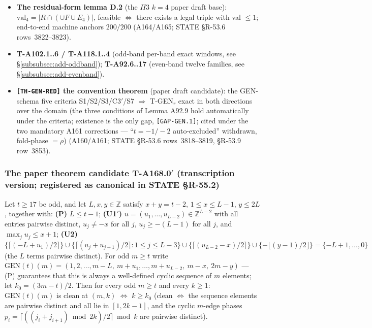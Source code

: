 \begin{itemize}
$42\to40$, $677\to659$) (A170/A171; STATE \S R-53.7 rows~3830--3831, \S
R-53.9 row~3858).
\item \textbf{The residual-form lemma D.2} (the $\Pi$3 $k=4$ paper draft
base): $\mathrm{val}_4=\lvert R\cap(\cup F\cup E_4)\rvert$,
feasible $\iff$ there exists a legal triple with val $\le1$; end-to-end
machine anchors $200/200$ (A164/A165; STATE \S R-53.6 rows~3822--3823).
\item \textbf{T-A102.1..6 / T-A118.1..4} (odd-band per-band exact windows,
see \S\ref{subsubsec:add-oddband}); \textbf{T-A92.6..17} (even-band twelve
families, see \S\ref{subsubsec:add-evenband}).
\item \textbf{\texttt{[TH-GEN-RED]} the convention theorem} (paper draft
candidate): the GEN-schema five criteria S1/S2/S3/C3$'$/S7 $\Rightarrow$
T-GEN$_r$ exact in both directions over the domain (the three conditions of
Lemma A92.9 hold automatically under the criteria; existence is the only gap,
\texttt{[GAP-GEN.1]}; cited under the two mandatory A161 corrections ---
``$t=-1/-2$ auto-excluded'' withdrawn, fold-phase $=\rho$) (A160/A161; STATE
\S R-53.6 rows~3818--3819, \S R-53.9 row~3853).
\end{itemize}

\subsubsection{The paper theorem candidate T-A168.0$'$ (transcription
version; registered as canonical in STATE \S R-55.2)
\tierPCand}\label{subsec:add-ta168paper}

\begin{theorem}\label{thm:ta168}
Let $t\ge17$ be odd, and let $L,x,y\in\mathbb{Z}$ satisfy $x+y=t-2$,
$1\le x\le L-1$, $y\le2L$, together with: \textbf{(P)} $L\le t-1$;
\textbf{(U1$'$)} $u=(u_1,\dots,u_{L-2})\in\mathbb{Z}^{L-2}$ with all entries
pairwise distinct, $u_j\ne-x$ for all $j$, $u_j\ge-(L-1)$ for all $j$, and
$\max_j u_j\le x+1$; \textbf{(U2)}
$\{\lceil(-L+u_1)/2\rceil\}\cup\{\lceil(u_j+u_{j+1})/2\rceil : 1\le j\le
L-3\}\cup\{\lceil(u_{L-2}-x)/2\rceil\}\cup\{-\lfloor(y-1)/2\rfloor\}
=\{-L+1,\dots,0\}$ (the $L$ terms pairwise distinct). For odd $m\ge t$ write
$\mathrm{GEN}(t)(m)=(1,2,\dots,m-L,\ m+u_1,\dots,m+u_{L-2},\ m-x,\ 2m-y)$
--- (P) guarantees that this is always a well-defined cyclic sequence of $m$
elements; let $k_0=(3m-t)/2$. Then for every odd $m\ge t$ and every
\textbf{$k\ge1$}: $\mathrm{GEN}(t)(m)$ is clean at $(m,k)$ $\iff$
$k\ge k_0$ (clean $\iff$ the sequence elements are pairwise distinct and all
lie in $[1,2k-1]$, and the cyclic $m$-edge phases
$p_i=\lceil((j_i+j_{i+1}) \bmod 2k)/2\rceil \bmod k$ are pairwise
distinct).
\end{theorem}

